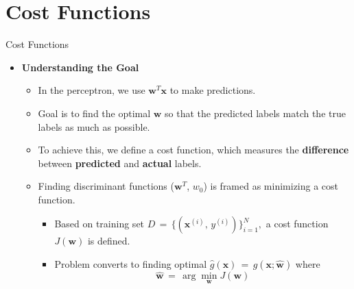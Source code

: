 \documentclass[serif, aspectratio=169]{beamer}
\begin{document}
\section{Cost Functions}


\begin{frame}{Cost Functions}
    \begin{itemize}
        \item \textbf{Understanding the Goal}
        \medskip
        \begin{itemize}\itemsep1em
            \item In the perceptron, we use \( \mathbf{w}^T \mathbf{x} \) to make predictions.
            \item Goal is to find the optimal \(\mathbf{w}\) so that the predicted labels match the true labels as much as possible.
            \item To achieve this, we define a cost function, which measures the \textbf{difference} between \textbf{predicted} and \textbf{actual} labels.
            \item Finding discriminant functions (\(\mathbf{w}^T\), \(w_0\)) is framed as minimizing a cost function.
            \smallskip
            \begin{itemize}\itemsep0.8em
                \item Based on training set \(D \, = \, \{(\mathbf{x}^{(i)},\, y^{(i)})\}^N_{i=1},\) a cost function \(J(\mathbf{w})\) is defined.
                \item Problem converts to finding optimal \(\hat{g}(\mathbf{x}) \, = \, g(\mathbf{x; \hat{w}})\) where \[\mathbf{\hat{w}} \, = \, \arg \min_{\mathbf{w}}J(\mathbf{w})\]
            \end{itemize}
        \end{itemize}
    \end{itemize}
\end{frame}
\end{document}

